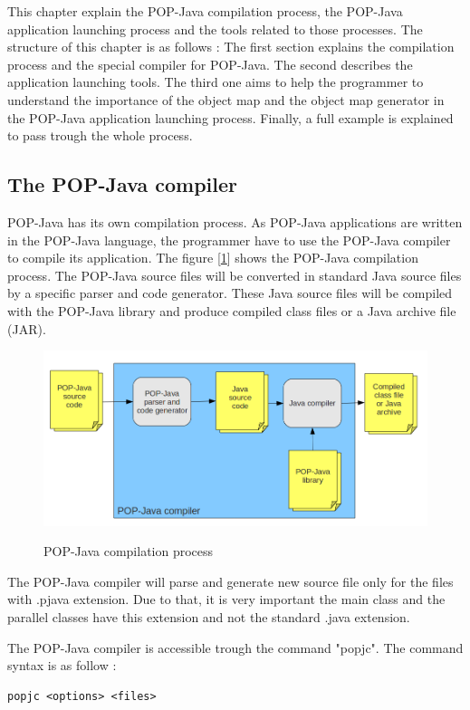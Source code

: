 \label{compileandrun}
This chapter explain the POP-Java compilation process, the POP-Java application launching process and the tools related to those processes. The structure of this chapter is as follows : The first section explains the compilation process and the special compiler for POP-Java. The second describes the application launching tools. The third one aims to help the programmer to understand the importance of the object map and the object map generator in the POP-Java application launching process. Finally, a full example is explained to pass trough the whole process. 


\subsection{The POP-Java compiler}
POP-Java has its own compilation process. As POP-Java applications are written in the POP-Java language, the programmer have to use the POP-Java compiler to compile its application. The figure [\ref{fig:popjava_compiler}] shows the POP-Java compilation process. The POP-Java source files will be converted in standard Java source files by a specific parser and code generator. These Java source files will be compiled with the POP-Java library and produce compiled class files or a Java archive file (JAR). \s


\begin{figure}[ht]
	\caption{POP-Java compilation process}
  	\centering
	\includegraphics[scale=0.6]{popjcompiler.png}
	\label{fig:popjava_compiler}
\end{figure}

The POP-Java compiler will parse and generate new source file only for the files with .pjava extension. Due to that, it is very important the main class and the parallel classes have this extension and not the standard .java extension.\s

The POP-Java compiler is accessible trough the command "popjc". The command syntax is as follow : 
\begin{lstlisting}
popjc <options> <files>
\end{lstlisting}\s

